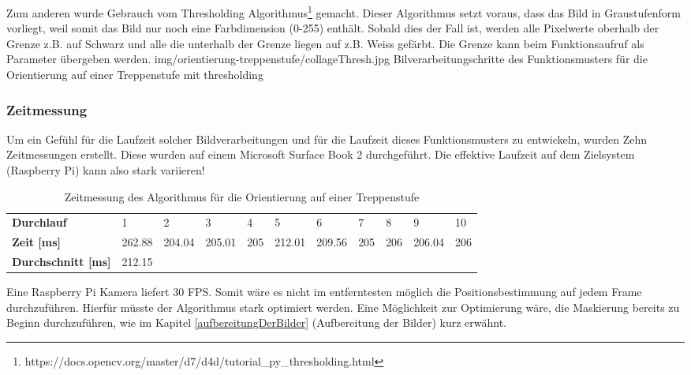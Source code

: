 Zum anderen wurde Gebrauch vom Thresholding Algorithmus\footnote{https://docs.opencv.org/master/d7/d4d/tutorial\_py\_thresholding.html} gemacht. Dieser Algorithmus setzt voraus, dass das Bild in Graustufenform vorliegt, weil somit das Bild nur noch eine Farbdimension (0-255) enthält. Sobald dies der Fall ist, werden alle Pixelwerte oberhalb der Grenze z.B. auf Schwarz und alle die unterhalb der Grenze liegen auf z.B. Weiss gefärbt. Die Grenze kann beim Funktionsaufruf als Parameter übergeben werden.
\image
  {img/orientierung-treppenstufe/collageThresh.jpg}
  {Bilverarbeitungschritte des Funktionsmusters für die Orientierung auf einer Treppenstufe mit thresholding}
  
\subsubsection{Zeitmessung}
Um ein Gefühl für die Laufzeit solcher Bildverarbeitungen und für die Laufzeit dieses Funktionsmusters zu entwickeln, wurden Zehn Zeitmessungen erstellt. Diese wurden auf einem Microsoft Surface Book 2 durchgeführt. Die effektive Laufzeit auf dem Zielsystem (Raspberry Pi) kann also stark variieren!

\begin{center}
\begin{table}[h!]
    \begin{tabular}{l|l|l|l|l|l|l|l|l|l|l}
        \textbf{Durchlauf} & 1 & 2 & 3 & 4 & 5 & 6 & 7 & 8 & 9 & 10 & \\
        \textbf{Zeit [ms]} & 262.88 & 204.04 & 205.01 & 205 & 212.01 & 209.56 & 205 & 206 & 206.04 & 206 & \\
        \textbf{Durchschnitt [ms]} & 212.15 & \\
    \end{tabular}
    \caption{Zeitmessung des Algorithmus für die Orientierung auf einer Treppenstufe}
\end{table}
\end{center}

Eine Raspberry Pi Kamera liefert 30 FPS. Somit wäre es nicht im entferntesten möglich die Positionsbestimmung auf jedem Frame durchzuführen. Hierfür müsste der Algorithmus stark optimiert werden. Eine Möglichkeit zur Optimierung wäre, die Maskierung bereits zu Beginn durchzuführen, wie im Kapitel \ref{aufbereitungDerBilder} (Aufbereitung der Bilder) kurz erwähnt.
  
